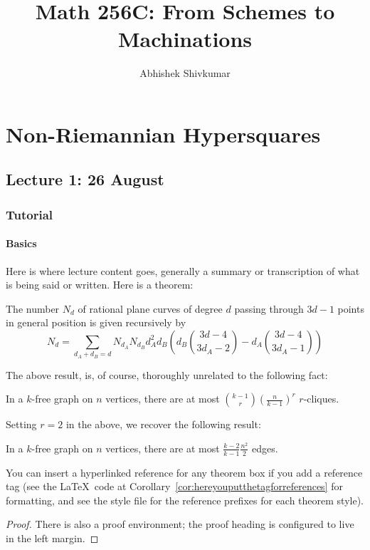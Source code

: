 \documentclass[justified, nofonts, notitlepage, openany, debug]{tufte-book}
\begin{document}
\title{Math 256C: From Schemes to Machinations}
\author{Abhishek Shivkumar}

\part{Non-Riemannian Hypersquares}

\chapter{Lecture 1: 26 August}
\section{Tutorial}
\subsection{Basics}

Here is where lecture content goes, generally a summary or transcription of what is being said or written. Here is a theorem:
\begin{thm}[Kontsevich]
    The number $N_d$ of rational plane curves of degree $d$ passing through $3d-1$ points in general position is given recursively by $$N_d = \sum_{d_A + d_B = d} N_{d_A} N_{d_B} d_A^2 d_B\left(d_B\binom{3d-4}{3d_A -2} - d_A \binom{3d-4}{3d_A-1}\right)$$
\end{thm}

The above result, is, of course, thoroughly unrelated to the following fact:
\begin{lem}
    In a $k$-free graph on $n$ vertices, there are at most $\binom{k-1}{r} (\frac{n}{k-1})^r$ $r$-cliques.
\end{lem}
Setting $r=2$ in the above, we recover the following result:
\begin{cor}
    In a $k$-free graph on $n$ vertices, there are at most $\frac{k-2}{k-1} \frac{n^2}{2}$ edges. 
\end{cor}
You can insert a hyperlinked reference for any theorem box if you add a reference tag (see the \LaTeX\ code at Corollary~\ref{cor:hereyouputthetagforreferences} for formatting, and see the style file for the reference prefixes for each theorem style).
\begin{proof}
    There is also a proof environment; the proof heading is configured to live in the left margin.
\end{proof}
\end{document}
